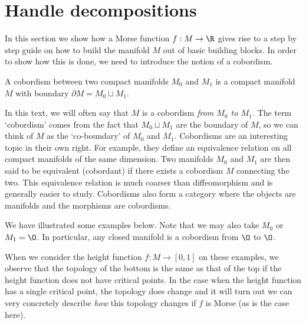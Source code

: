 \section{Handle decompositions}
In this section we show how a Morse function $f: M \to  \R$ gives rise to a step by step guide on how to build the manifold $M$ out of basic building blocks.
In order to show how this is done, we need to introduce the notion of a cobordism.


\begin{definition}
A cobordism between two compact manifolds $M_0$ and $M_1$ is a compact manifold $M$  with boundary $\partial M = M_0 \sqcup M_1$.
\end{definition}

In this text, we will often say that $M$ is a cobordism \emph{from $M_0$ to $M_1$.}
The term `cobordism' comes from the fact that $M_0 \sqcup M_1$ are the boundary of $M$, so we can think of $M$ as the `co-boundary' of $M_0$ and $M_1$.
Cobordisms are an interesting topic in their own right.
For example, they define an equivalence relation on all compact manifolds of the same dimension. Two manifolds $ M_0$ and $M_1$ are then said to be equivalent (cobordant) if there exists a cobordism $M$ connecting the two.
This equivalence relation is much coarser than diffeomorphism and is generally easier to study.
Cobordisms also form a category where the objects are manifolds and the morphisms are cobordisms.

We have illustrated some examples below.
Note that we may also take $M_0$ or $M_1 = \O$.
In particular, any closed manifold is a cobordism from $\O$ to $\O$.
\begin{figure}[H]
    \centering
\end{figure}

When we consider the height function $f: M \to  [0, 1]$ on these examples,
we observe that the topology of the bottom is the same as that of the top if the height function does not have critical points.
In the case when the height function has a single critical point, the topology does change and it will turn out we can very concretely describe \emph{how} this topology changes if $f$ is Morse (as is the case here).

